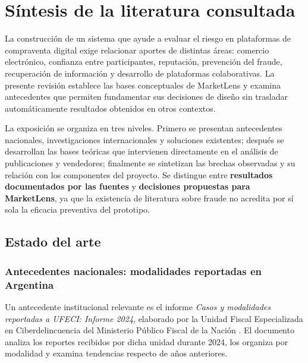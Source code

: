 
\chapter{Síntesis de la literatura consultada}\label{cap:marco-teorico}

La construcción de un sistema que ayude a evaluar el riesgo en plataformas de compraventa digital exige relacionar aportes de distintas áreas: comercio electrónico, confianza entre participantes, reputación, prevención del fraude, recuperación de información y desarrollo de plataformas colaborativas. La presente revisión establece las bases conceptuales de MarketLens y examina antecedentes que permiten fundamentar sus decisiones de diseño sin trasladar automáticamente resultados obtenidos en otros contextos.

La exposición se organiza en tres niveles. Primero se presentan antecedentes nacionales, investigaciones internacionales y soluciones existentes; después se desarrollan las bases teóricas que intervienen directamente en el análisis de publicaciones y vendedores; finalmente se sintetizan las brechas observadas y su relación con los componentes del proyecto. Se distingue entre \textbf{resultados documentados por las fuentes} y \textbf{decisiones propuestas para MarketLens}, ya que la existencia de literatura sobre fraude no acredita por sí sola la eficacia preventiva del prototipo.

\section{Estado del arte}\label{sec:ml-estado-arte}

\subsection{Antecedentes nacionales: modalidades reportadas en Argentina}\label{subsec:ml-antecedentes-nacionales}

Un antecedente institucional relevante es el informe \emph{Casos y modalidades reportadas a UFECI: Informe 2024}, elaborado por la Unidad Fiscal Especializada en Ciberdelincuencia del Ministerio Público Fiscal de la Nación \parencite{ml-ufeci-2025}. El documento analiza los reportes recibidos por dicha unidad durante 2024, los organiza por modalidad y examina tendencias respecto de años anteriores.

